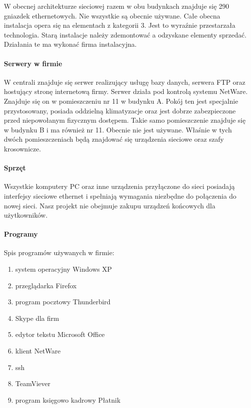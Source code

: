 \documentclass{report}
\begin{document}
W obecnej architekturze sieciowej razem w obu budynkach znajduje się 290 gniazdek ethernetowych. Nie wszystkie są obecnie używane.
Całe obecna instalacja opera się na elementach z kategorii 3. Jest to wyraźnie przestarzała technologia. Starą instalacje należy zdemontować a 
odzyskane elementy sprzedać. Działania te ma wykonać firma instalacyjna.

\paragraph{Serwery w firmie}



W centrali znajduje się serwer realizujący usługę
bazy danych, serwera FTP oraz hostujący stronę internetową firmy. Serwer działa pod kontrolą systemu NetWare. Znajduje się on w
pomieszczeniu nr 11 w budynku A. Pokój ten jest specjalnie przystosowany, posiada oddzielną klimatyzacje oraz jest 
dobrze zabezpieczone przed niepowołanym fizycznym dostępem. Takie samo pomieszczenie znajduje się w budynku B i ma również nr 11. Obecnie nie jest
używane. Właśnie w tych dwóch pomieszczeniach będą znajdować się urządzenia sieciowe oraz szafy krosownicze.

\paragraph{Sprzęt}


Wszystkie komputery PC oraz inne urządzenia przyłączone do sieci posiadają interfejsy sieciowe ethernet i spełniają wymagania niezbędne
do połączenia do nowej sieci. Nasz projekt nie obejmuje zakupu urządzeń końcowych dla użytkowników.

\paragraph{Programy} Spis programów używanych w firmie:
\begin{enumerate}
 \item system operacyjny Windows XP
 \item przeglądarka Firefox
 \item program pocztowy Thunderbird
 \item Skype dla firm
 \item edytor tekstu Microsoft Office
 \item klient NetWare
 \item ssh
 \item TeamViever
 \item program księgowo kadrowy Płatnik
\end{enumerate}
\end{document}
